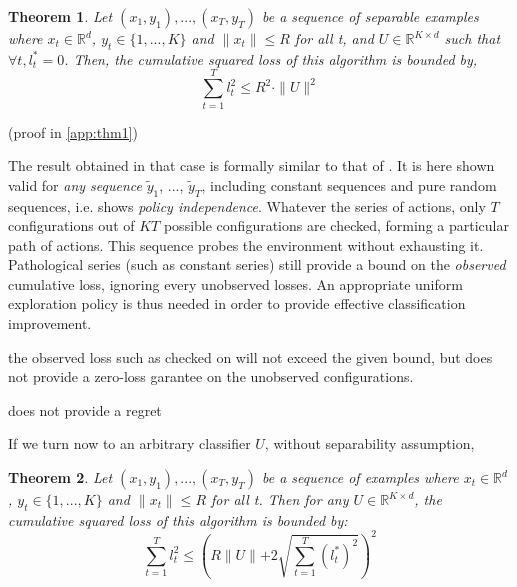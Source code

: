 \documentclass[preprint,12pt,authoryear]{elsarticle}
\newtheorem{theorem}{Theorem}
\begin{document}



\begin{theorem}
	\label{theo:BPAT1}
	Let $(x_1,y_1),...,(x_T,y_T)$ be a sequence of separable examples where $x_t \in \mathbb{R}^d$, $y_t\in \{1,...,K\}$ and $\parallel x_t \parallel\leqslant R$ for all t, and $U \in \mathbb{R}^{K\times d}$ such that $ \forall t, l^*_t=0$. Then, the cumulative squared loss of this algorithm is bounded by,
	\begin{equation}
	\sum_{t=1}^{T} l_t^2 \leqslant R^2\cdot \parallel{U}\parallel^2
	\end{equation}
\end{theorem}
(proof in \ref{app:thm1})

The result obtained in that case is formally similar to that of  \cite{crammer2006online}. It is here shown valid for \emph{any sequence} $\tilde{y}_1$, ..., $\tilde{y}_T$, including constant sequences and pure random sequences, i.e. shows \emph{policy independence}.
Whatever the series of actions, only $T$ configurations out of $KT$ possible configurations are checked, forming a particular path of actions. This sequence probes the environment without exhausting it. Pathological series (such as constant series) still provide a bound on the \emph{observed} cumulative loss, ignoring every unobserved losses. An appropriate uniform exploration policy is thus needed in order {\color{red} to provide effective classification improvement.}


the observed loss such as checked on  will not exceed the given bound, but does not provide a zero-loss garantee on the  unobserved configurations.   


does not provide a regret  

If we turn now to an arbitrary classifier $U$, without separability assumption, 

\begin{theorem}
	\label{theo:BPAT2}
	Let $(x_1,y_1),...,(x_T,y_T) $ be a sequence of examples where  $x_t\in \mathbb{R}^d$, $y_t \in \{1,...,K\}$ and $\parallel{x_t}\parallel \leqslant R$ for all t. Then for any  $U \in \mathbb{R}^{K\times d}$, the cumulative squared loss of this algorithm is bounded by:
	\[\sum_{t=1}^{T}l_t^2 \leqslant \left(R\parallel{U}\parallel+2 \sqrt{\sum_{t=1}^{T}(l_t^{\ast})^2}\right)^2 \]
\end{theorem}
\end{document}
